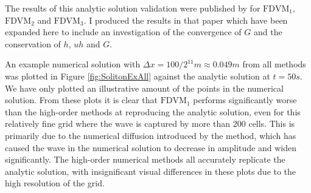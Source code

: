 The results of this analytic solution validation were published by \citet{Zoppou-etal-2017} for $\text{FDVM}_1$, $\text{FDVM}_2$ and $\text{FDVM}_3$. I produced the results in that paper which have been expanded here to include an investigation of the convergence of $G$ and the conservation of $h$, $uh$ and $G$.

An example numerical solution with $\Delta x = {100} / {2^{11}}m \approx 0.049m$ from all methods was plotted in Figure \ref{fig:SolitonExAll} against the analytic solution at $t= 50s$. We have only plotted an illustrative amount of the points in the numerical solution. From these plots it is clear that $\text{FDVM}_1$ performs significantly worse than the high-order methods at reproducing the analytic solution, even for this relatively fine grid where the wave is captured by more than $200$ cells. This is primarily due to the numerical diffusion introduced by the method, which has caused the wave in the numerical solution to decrease in amplitude and widen significantly. The high-order numerical methods all accurately replicate the analytic solution, with insignificant visual differences in these plots due to the high resolution of the grid.

